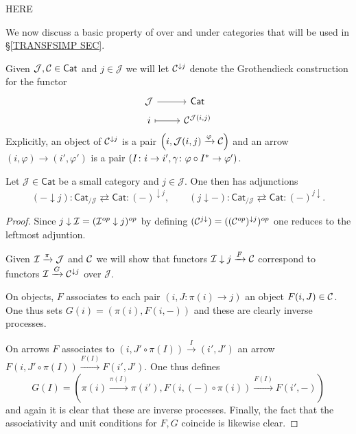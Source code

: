 \documentclass[a4paper,10pt]{article}%
\begin{document}
{\color{red} HERE}



We now discuss a basic property of over and under categories that will be used in \S \ref{TRANSFSIMP SEC}.


Given $\mathcal{J},\mathcal{C} \in \mathsf{Cat}$ and $j \in \mathcal{J}$ we will let $\mathcal{C}^{ \downarrow j}$ denote the Grothendieck construction for the functor
\[
\begin{tikzcd}[row sep = 0.25em]
	\mathcal{J} \ar{r} & \mathsf{Cat} \\
	i \ar[mapsto]{r} & \C^{\mathcal{J}(i,j)}
\end{tikzcd}
\]
Explicitly, an object of $\mathcal{C}^{\downarrow j}$ is a pair
$\left(i,\mathcal{J}(i,j)\xrightarrow{\varphi} \mathcal{C}\right)$
and an arrow 
$(i,\varphi) \to (i',\varphi')$
is a pair
$(I \colon i \to i', 
\gamma \colon \varphi\circ I^{\**} \to \varphi')$.



\begin{lemma}\label{UNDERLEFTADJ LEM}
Let $\mathcal{J} \in \mathsf{Cat}$ be a small category and 
$j \in \mathcal{J}$. One then has adjunctions
\[
	(\minus \downarrow j) 
		\colon
	\mathsf{Cat}_{/\mathcal{J}}
		\rightleftarrows
	\mathsf{Cat}
		\colon
	(\minus)^{\downarrow j},
\qquad
	(j \downarrow \minus) 
		\colon
	\mathsf{Cat}_{/\mathcal{J}}
		\rightleftarrows
	\mathsf{Cat}
		\colon
	(\minus)^{j \downarrow}.
\]
\end{lemma}

\begin{proof}
Since $j \downarrow \mathcal{I} = (\mathcal{I}^{op} \downarrow j)^{op}$ by  defining $(\mathcal{C}^{j \downarrow}) = ((\mathcal{C}^{op})^{\downarrow j})^{op}$ one reduces to the leftmost adjuntion.

	Given $\mathcal{I} \xrightarrow{\pi} \mathcal{J}$ and $\mathcal{C}$ we will show that functors 
	$\mathcal{I} \downarrow j \xrightarrow{F} \mathcal{C}$
correspond to functors
	$\mathcal{I} \xrightarrow{G} \mathcal{C}^{\downarrow j}$ over $\mathcal{J}$.
	
	On objects, $F$ associates to each pair 
	$(i,J\colon \pi(i) \to j)$ an object $F(i,J)\in \mathcal{C}$. One thus sets $G(i)=(\pi(i), F(i,\minus))$ and these are clearly inverse processes.

	On arrows $F$ associates to 
	$(i,J' \circ \pi(I)) \xrightarrow{I} (i',J')$ an arrow
	$F(i,J' \circ \pi(I)) \xrightarrow{F(I)} F(i',J')$.
	One thus defines
\[
	G(I) = \left(
	\pi(i) \xrightarrow{\pi(I)} \pi(i'),
	F\left(i,(\minus)\circ \pi(i)\right)
		\xrightarrow{F(I)}
	F\left(i',\minus \right)
	\right)
\]
and again it is clear that these are inverse processes.
	Finally, the fact that the associativity and unit conditions for $F,G$ coincide is likewise clear.
\end{proof}
\end{document}

